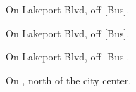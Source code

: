 

\begin{LocationList}

On Lakeport Blvd, off  [Bus].

On Lakeport Blvd, off  [Bus].

On Lakeport Blvd, off  [Bus].

\Location{\TruckStop \Gas \Rest}
On , north of the city center.

\end{LocationList}
